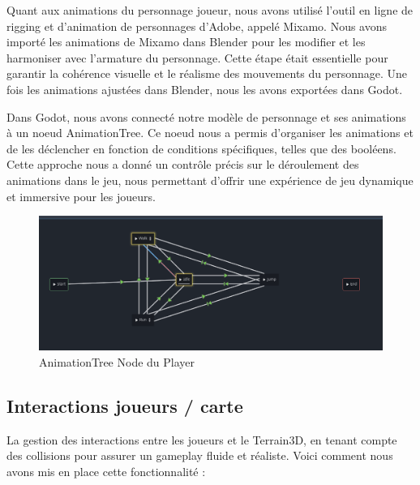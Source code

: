 \documentclass[
	article,			%
	11pt,				%
	oneside,			%
	a4paper,			%
	chapter=TITLE,
	french,			%
	sumario=tradicional
	]{base_nt}
\begin{document}
Quant aux animations du personnage joueur, nous avons utilisé l'outil en ligne de rigging et d'animation de personnages d'Adobe, appelé Mixamo. Nous avons importé les animations de Mixamo dans Blender pour les modifier et les harmoniser avec l'armature du personnage. Cette étape était essentielle pour garantir la cohérence visuelle et le réalisme des mouvements du personnage. Une fois les animations ajustées dans Blender, nous les avons exportées dans Godot.

Dans Godot, nous avons connecté notre modèle de personnage et ses animations à un noeud AnimationTree. Ce noeud nous a permis d'organiser les animations et de les déclencher en fonction de conditions spécifiques, telles que des booléens. Cette approche nous a donné un contrôle précis sur le déroulement des animations dans le jeu, nous permettant d'offrir une expérience de jeu dynamique et immersive pour les joueurs.

\begin{figure}[ht]
	\caption{AnimationTree Node du Player}
	\centering
	\includegraphics[width=1\linewidth]{paper4.png}
	\legend{}
	
\end{figure}

\newpage

\vspace{0cm}

\subsection{Interactions joueurs / carte}


La gestion des interactions entre les joueurs et le Terrain3D, en tenant compte des collisions pour assurer un gameplay fluide et réaliste. Voici comment nous avons mis en place cette fonctionnalité :
\end{document}
